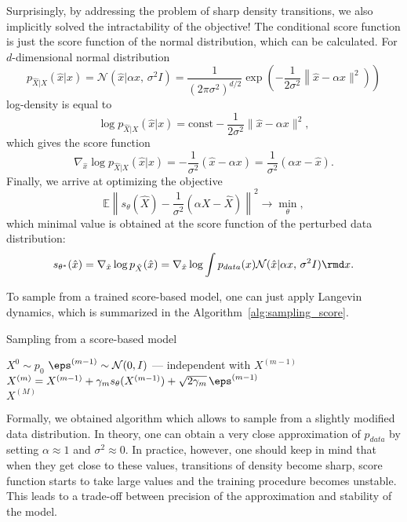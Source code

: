 Surprisingly, by addressing the problem of sharp density transitions, we also implicitly solved the intractability of the objective! The conditional score function is just the score function of the normal distribution, which can be calculated. For $d$-dimensional normal distribution
\[
    p_{\hat{X} | X}(\hat{x} | x) = \mathcal{N}(\hat{x} | \alpha x,\, \sigma^2 I) = \frac{1}{(2 \pi \sigma^2)^{d/2}}\exp\left(-\frac{1}{2\sigma^2}\left\| \hat{x} - \alpha x \|^2 \right)\right)
\]
log-density is equal to
\[
    \log p_{\hat{X} | X}(\hat{x} | x) = \text{const} - \frac{1}{2\sigma^2}\|\hat{x} - \alpha x\|^2,
\]
which gives the score function
\[
    \nabla_{\hat{x}} \log p_{\hat{X} | X}(\hat{x} | x) = -\frac{1}{\sigma^2} (\hat{x} - \alpha x) = \frac{1}{\sigma^2}(\alpha x - \hat{x}).
\]
Finally, we arrive at optimizing the objective
\[
    \mathbb{E} \left\| s_\theta(\hat{X}) - \frac{1}{\sigma^2}(\alpha X - \hat{X}) \right\|^2 \rightarrow \min\limits_{\theta},
\]
which minimal value is obtained at the score function of the perturbed data distribution:
\[
    s_{\theta^*}(\hat{x}) = \nabla_{\hat{x}} \log p_{\hat{X}}(\hat{x}) = \nabla_{\hat{x}} \log \int p_{data}(x) \mathcal{N}(\hat{x} | \alpha x, \, \sigma^2 I)\rmd x.
\]

To sample from a trained score-based model, one can just apply Langevin dynamics, which is summarized in the Algorithm~\ref{alg:sampling_score}.
\begin{algorithm}
\caption{Sampling from a score-based model}\label{alg:sampling_score}
\begin{algorithmic}
\State $X^{0} \sim p_0$
    \State $\eps^{(m - 1)} \sim \mathcal{N}(0, I)$ --- independent with $X^{(m - 1)}$
    \State $X^{(m)} = X^{(m - 1)} + \gamma_m s_\theta(X^{(m - 1)}) + \sqrt{2 \gamma_m}\, \eps^{(m - 1)}$ 
\EndFor \\
\Return $X^{(M)}$
\end{algorithmic}
\end{algorithm}

Formally, we obtained algorithm which allows to sample from a slightly modified data distribution. In theory, one can obtain a very close approximation of $p_{data}$ by setting $\alpha \approx 1$ and $\sigma^2 \approx 0$. In practice, however, one should keep in mind that when they get close to these values, transitions of density become sharp, score function starts to take large values and the training procedure becomes unstable. This leads to a trade-off between precision of the approximation and stability of the model.

